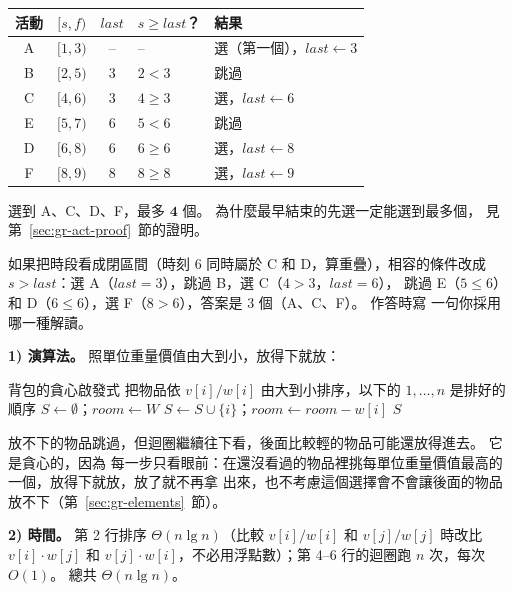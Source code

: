 \begin{center}
\begin{tabular}{cccll}
\toprule
活動 & $[s, f)$ & $\mathit{last}$ & $s \ge \mathit{last}$？ & 結果 \\
\midrule
A & $[1, 3)$ & -- & -- & 選（第一個），$\mathit{last} \gets 3$ \\
B & $[2, 5)$ & 3 & $2 < 3$ & 跳過 \\
C & $[4, 6)$ & 3 & $4 \ge 3$ & 選，$\mathit{last} \gets 6$ \\
E & $[5, 7)$ & 6 & $5 < 6$ & 跳過 \\
D & $[6, 8)$ & 6 & $6 \ge 6$ & 選，$\mathit{last} \gets 8$ \\
F & $[8, 9)$ & 8 & $8 \ge 8$ & 選，$\mathit{last} \gets 9$ \\
\bottomrule
\end{tabular}
\end{center}

選到 A、C、D、F，最多 $\mathbf{4}$ 個。 為什麼最早結束的先選一定能選到最多個，
見第~\ref{sec:gr-act-proof}~節的證明。

如果把時段看成閉區間（時刻 $6$ 同時屬於 C 和 D，算重疊），相容的條件改成
$s > \mathit{last}$：選 A（$\mathit{last} = 3$），跳過 B，選 C（$4 > 3$，$\mathit{last} = 6$），
跳過 E（$5 \le 6$）和 D（$6 \le 6$），選 F（$8 > 6$），答案是 $3$ 個（A、C、F）。 作答時寫
一句你採用哪一種解讀。

\textbf{1) 演算法。} 照單位重量價值由大到小，放得下就放：

\begin{pseudo}[unbreakable]{背包的貪心啟發式}
    \State 把物品依 $v[i] / w[i]$ 由大到小排序，以下的 $1, \ldots, n$ 是排好的順序
    \State $S \gets \emptyset$；$\mathit{room} \gets W$
            \State $S \gets S \cup \{i\}$；$\mathit{room} \gets \mathit{room} - w[i]$
        \EndIf
    \EndFor
    \State \Return $S$
\EndFunction
\end{pseudo}

放不下的物品跳過，但迴圈繼續往下看，後面比較輕的物品可能還放得進去。 它是貪心的，因為
每一步只看眼前：在還沒看過的物品裡挑每單位重量價值最高的一個，放得下就放，放了就不再拿
出來，也不考慮這個選擇會不會讓後面的物品放不下（第~\ref{sec:gr-elements}~節）。

\textbf{2) 時間。} 第 2 行排序 $\Theta(n \lg n)$（比較 $v[i] / w[i]$ 和 $v[j] / w[j]$ 時改比
$v[i] \cdot w[j]$ 和 $v[j] \cdot w[i]$，不必用浮點數）；第 4--6 行的迴圈跑 $n$ 次，每次
$O(1)$。 總共 $\Theta(n \lg n)$。


